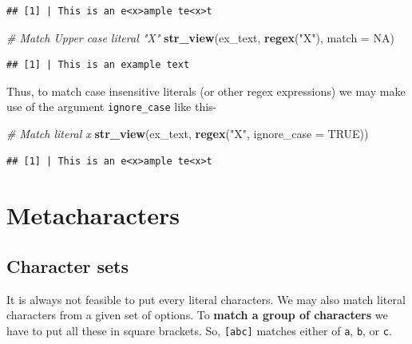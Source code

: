 \documentclass[
]{book}
\newenvironment{Shaded}{\begin{snugshade}}{\end{snugshade}}
\newcommand{\AttributeTok}[1]{\textcolor[rgb]{0.13,0.29,0.53}{#1}}
\newcommand{\CommentTok}[1]{\textcolor[rgb]{0.56,0.35,0.01}{\textit{#1}}}
\newcommand{\ConstantTok}[1]{\textcolor[rgb]{0.56,0.35,0.01}{#1}}
\newcommand{\FunctionTok}[1]{\textcolor[rgb]{0.13,0.29,0.53}{\textbf{#1}}}
\newcommand{\NormalTok}[1]{#1}
\newcommand{\StringTok}[1]{\textcolor[rgb]{0.31,0.60,0.02}{#1}}
\begin{document}
\begin{verbatim}
## [1] | This is an e<x>ample te<x>t
\end{verbatim}

\begin{Shaded}
\begin{Highlighting}[]
\CommentTok{\# Match Upper case literal "X"}
\FunctionTok{str\_view}\NormalTok{(ex\_text, }\FunctionTok{regex}\NormalTok{(}\StringTok{"X"}\NormalTok{), }\AttributeTok{match =} \ConstantTok{NA}\NormalTok{)}
\end{Highlighting}
\end{Shaded}

\begin{verbatim}
## [1] | This is an example text
\end{verbatim}

Thus, to match case insensitive literals (or other regex expressions) we may make use of the argument \texttt{ignore\_case} like this-

\begin{Shaded}
\begin{Highlighting}[]
\CommentTok{\# Match literal \textasciigrave{}x\textasciigrave{}}
\FunctionTok{str\_view}\NormalTok{(ex\_text, }\FunctionTok{regex}\NormalTok{(}\StringTok{"X"}\NormalTok{, }\AttributeTok{ignore\_case =} \ConstantTok{TRUE}\NormalTok{))}
\end{Highlighting}
\end{Shaded}

\begin{verbatim}
## [1] | This is an e<x>ample te<x>t
\end{verbatim}

\hypertarget{metacharacters}{%
\section{Metacharacters}\label{metacharacters}}

\hypertarget{character-sets}{%
\subsection{Character sets}\label{character-sets}}

It is always not feasible to put every literal characters. We may also match literal characters from a given set of options. To \textbf{match a group of characters} we have to put all these in square brackets. So, \texttt{{[}abc{]}} matches either of \texttt{a}, \texttt{b}, or \texttt{c}.
\end{document}

